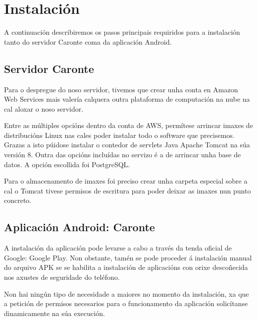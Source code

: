 \section{Instalación}
A continuación describiremos os pasos principais requiridos para a instalación tanto do servidor Caronte coma da aplicación Android.

\subsection{Servidor Caronte}
Para o despregue do noso servidor, tivemos que crear unha conta en Amazon Web Services mais valería calquera outra plataforma de computación na nube na cal aloxar o noso servidor.

Entre as múltiples opcións dentro da conta de AWS, permítese arrincar imaxes de distribucións Linux nas cales poder instalar todo o software que precisemos. Grazas a isto púidose instalar o contedor de servlets Java Apache Tomcat na súa versión 8. Outra das opcións incluídas no servizo é a de arrincar unha base de datos. A opción escollida foi PostgreSQL.

Para o almacenamento de imaxes foi preciso crear unha carpeta especial sobre a cal o Tomcat tivese permisos de escritura para poder deixar as imaxes nun punto concreto.

\subsection{Aplicación Android: Caronte}
A instalación da aplicación pode levarse a cabo a través da tenda oficial de Google: Google Play. Non obstante, tamén se pode proceder á instalación manual do arquivo APK se se habilita a instalación de aplicacións con orixe descoñecida nos axustes de seguridade do teléfono.

Non hai ningún tipo de necesidade a maiores no momento da instalación, xa que a petición de permisos necesarios para o funcionamento da aplicación solicítanse dinamicamente na súa execución.


